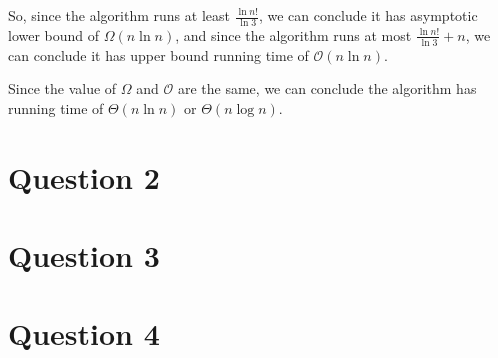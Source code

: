 \documentclass[12pt]{article}
\begin{document}
\begin{enumerate}[a.]
\begin{mdframed}
        \bigskip

        So, since the algorithm runs at least $\frac{\ln n!}{\ln 3}$, we can
        conclude it has asymptotic lower bound of $\Omega(n \ln n)$, and since
        the algorithm runs at most $\frac{\ln n!}{\ln 3} + n$, we can conclude it
        has upper bound running time of $\mathcal{O}(n\ln n)$.

        \bigskip

        Since the value of $\Omega$ and $\mathcal{O}$ are the same, we can conclude
        the algorithm has running time of $\Theta(n \ln n)$ or $\Theta(n \log n)$.
        \color{black}

    \end{mdframed}

\end{enumerate}

\section*{Question 2}

\section*{Question 3}

\section*{Question 4}
\end{document}
